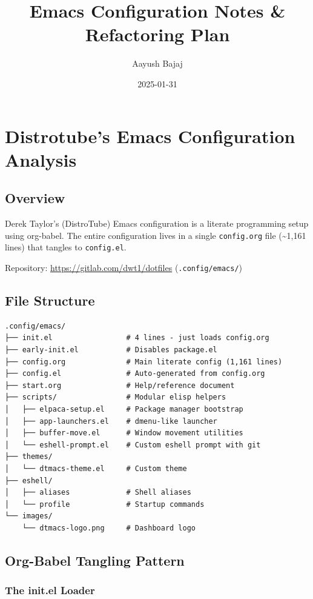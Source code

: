 \documentclass[11pt]{article}
\author{Aayush Bajaj}
\date{2025-01-31}
\title{Emacs Configuration Notes \& Refactoring Plan}
\begin{document}
\maketitle
\setcounter{tocdepth}{2}
\tableofcontents

\section{Distrotube's Emacs Configuration Analysis}
\label{sec:org82e4876}

\subsection{Overview}
\label{sec:org396c1b6}

Derek Taylor's (DistroTube) Emacs configuration is a literate programming setup using org-babel.
The entire configuration lives in a single \texttt{config.org} file (\textasciitilde{}1,161 lines) that tangles to \texttt{config.el}.

Repository: \url{https://gitlab.com/dwt1/dotfiles} (\texttt{.config/emacs/})
\subsection{File Structure}
\label{sec:org81f6738}

\begin{verbatim}
.config/emacs/
├── init.el                 # 4 lines - just loads config.org
├── early-init.el           # Disables package.el
├── config.org              # Main literate config (1,161 lines)
├── config.el               # Auto-generated from config.org
├── start.org               # Help/reference document
├── scripts/                # Modular elisp helpers
│   ├── elpaca-setup.el     # Package manager bootstrap
│   ├── app-launchers.el    # dmenu-like launcher
│   ├── buffer-move.el      # Window movement utilities
│   └── eshell-prompt.el    # Custom eshell prompt with git
├── themes/
│   └── dtmacs-theme.el     # Custom theme
├── eshell/
│   ├── aliases             # Shell aliases
│   └── profile             # Startup commands
└── images/
    └── dtmacs-logo.png     # Dashboard logo
\end{verbatim}
\subsection{Org-Babel Tangling Pattern}
\label{sec:org7da1ad3}

\subsubsection{The init.el Loader}
\label{sec:orgebefe98}
\end{document}
